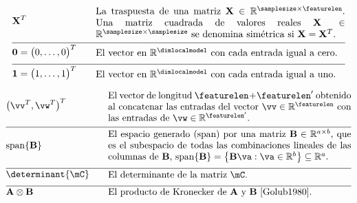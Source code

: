 \begin{align}
	&\mathbf{X}^{T} &\quad & \parbox{.75\textwidth}{La traspuesta de una matriz $\mathbf{X} \in \mathbb{R}^{\samplesize \times \featurelen}$. 
		Una matriz cuadrada de valores reales $\mathbf{X} \in \mathbb{R}^{\samplesize \times \samplesize}$ 
		se denomina simétrica si $\mathbf{X} = \mathbf{X}^{T}$. }  \nonumber \\[2mm] \hline \nonumber\\[-5mm]
	&\mathbf{0}= \big(0,\ldots,0\big)^{T}  & \quad &  \parbox{.75\textwidth}{El vector en $\mathbb{R}^{\dimlocalmodel}$ con cada entrada igual a cero.} \nonumber \\[2mm] \hline \nonumber\\[-5mm]
	&\mathbf{1}= \big(1,\ldots,1\big)^{T}  & \quad &  \parbox{.75\textwidth}{El vector en $\mathbb{R}^{\dimlocalmodel}$ con cada entrada igual a uno.} \nonumber
\end{align} 

\newpage
\begin{align} 
	&\big(\vv^{T},\vw^{T} \big)^{T}  & \quad &  \parbox{.75\textwidth}{El vector de longitud $\featurelen+\featurelen'$ 
		obtenido al concatenar las entradas del vector $\vv \in \mathbb{R}^{\featurelen}$ con las entradas de $\vw \in \mathbb{R}^{\featurelen'}$.} \nonumber \\[2mm] \hline \nonumber\\[-5mm]
	&	{\rm span}\{ \mathbf{B} \}  & \quad &  \parbox{.75\textwidth}{El espacio generado (span) por una matriz $\mathbf{B} \in \mathbb{R}^{a \times b}$, 
		que es el subespacio de todas las combinaciones lineales de las columnas de $\mathbf{B}$, 
		${\rm span}\{ \mathbf{B} \} = \big\{  \mathbf{B} \va : \va \in \mathbb{R}^{b} \big\} \subseteq \mathbb{R}^{a}$.}\nonumber \\[2mm] \hline \nonumber\\[-5mm]
	&\determinant{\mC} &\quad & \parbox{.75\textwidth}{El determinante de la matriz $\mC$. } \nonumber \\[2mm] \hline \nonumber\\[-5mm]
	&\mathbf{A} \otimes \mathbf{B} &\quad & \parbox{.75\textwidth}{El producto de Kronecker de $\mathbf{A}$ y $\mathbf{B}$ \cite{Golub1980}. }  \nonumber
\end{align} 


\newpage
